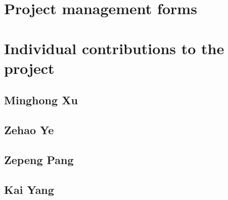 \newpage
\appendix
\appendixpage
\addappheadtotoc

\chapter{Project management forms}








\chapter{Individual contributions to the project}
\section{Minghong Xu}
\section{Zehao Ye}
\section{Zepeng Pang}
\section{Kai Yang}
